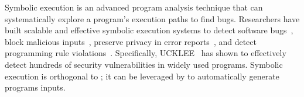  Symbolic execution is an advanced program
analysis technique that can systematically explore a program's execution paths
to find bugs. Researchers have built scalable and effective symbolic execution 
systems to detect software 
bugs~\cite{dart:pldi,cute:fse,godefroid:grammar-fuzzing,
godefroid:whitebox-fuzzing,
klee:osdi08,yang:malicious-disk:oakland06,cadar:exe:ccs06,s2e:hotdep09,
taas:socc10, ucklee:usec15}, block malicious 
inputs~\cite{castro:bouncer}, preserve privacy in error 
reports~\cite{castro:bug-report-privacy}, and detect programming rule 
violations~\cite{woodpecker:asplos13}. Specifically, 
UCKLEE~\cite{ucklee:usec15} has shown to effectively detect hundreds of 
security vulnerabilities in widely used programs. Symbolic execution 
is orthogonal to \xxx; it can be leveraged by \xxx to automatically generate 
programs inputs.
